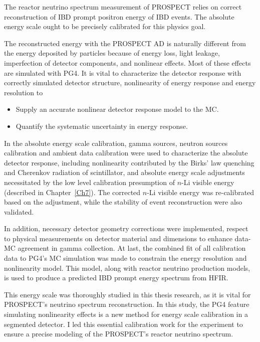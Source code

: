 \label{Ch8}

The reactor neutrino spectrum measurement of PROSPECT relies on correct reconstruction of IBD prompt positron energy of IBD events. 
The absolute energy scale ought to be precisely calibrated for this physics goal.

The reconstructed energy with the PROSPECT AD is naturally different from the energy deposited by particles because of energy loss, light leakage, imperfection of detector components, and nonlinear effects.
Most of these effects are simulated with PG4.
It is vital to characterize the detector response with correctly simulated detector structure, nonlinearity of energy response and energy resolution to
\begin{itemize}
    \item Supply an accurate nonlinear detector response model to the MC.
    \item Quantify the systematic uncertainty in energy response. 
\end{itemize}

In the absolute energy scale calibration, gamma sources, neutron sources calibration and ambient data calibration were used to characterize the absolute detector response, including nonlinearity contributed by the Birks' law quenching and Cherenkov radiation of scintillator, and absolute energy scale adjustments necessitated by the low level calibration presumption of $n$-Li visible energy (described in Chapter~\ref{Ch7}). 
The corrected $n$-Li visible energy was re-calibrated based on the adjustment, while the stability of event reconstruction were also validated.

In addition, necessary detector geometry corrections were implemented, respect to physical measurements on detector material and dimensions to enhance data-MC agreement in gamma collection.
At last, the combined fit of all calibration data to PG4's MC simulation was made to constrain  the energy resolution and nonlinearity model.
This model, along with reactor neutrino production models, is used to produce a predicted IBD prompt energy spectrum from HFIR.

This energy scale was thoroughly studied in this thesis research, as it is vital for PROSPECT's neutrino spectrum reconstruction. 
In this study, the PG4 feature simulating nonlinearity effects is a new method for energy scale calibration in a segmented detector.
I led this essential calibration work for the experiment to ensure a precise modeling of the PROSPECT's reactor neutrino spectrum.

